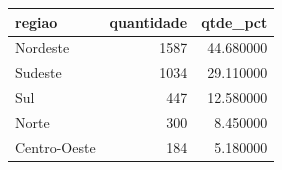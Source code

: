 \begin{tabular}{lrr}
\toprule
regiao & quantidade & qtde_pct \\
\midrule
Nordeste & 1587 & 44.680000 \\
Sudeste & 1034 & 29.110000 \\
Sul & 447 & 12.580000 \\
Norte & 300 & 8.450000 \\
Centro-Oeste & 184 & 5.180000 \\
\bottomrule
\end{tabular}
